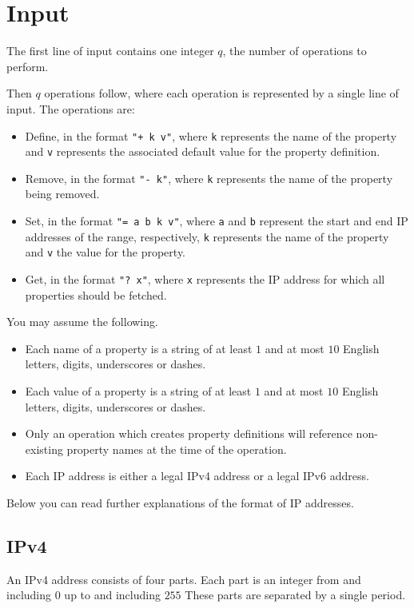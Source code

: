 \section*{Input}
The first line of input contains one integer $q$, the number of operations to perform.

Then $q$ operations follow, where each operation is represented by a single line of input.
The operations are:

\begin{itemize}
    \item Define, in the format \texttt{"+ k v"},
        where \texttt{k} represents the name of the property and \texttt{v} represents the associated default value for the property definition.
    \item Remove, in the format \texttt{"- k"}, where \texttt{k} represents the name of the property being removed.
    \item Set, in the format \texttt{"= a b k v"}, where \texttt{a} and \texttt{b} represent the start and end IP addresses of the range, respectively,
        \texttt{k} represents the name of the property and \texttt{v} the value for the property.
    \item Get, in the format \texttt{"? x"}, where \texttt{x} represents the IP address for which all properties should be fetched.
\end{itemize}

You may assume the following.
\begin{itemize}
    \item Each name of a property is a string of at least $1$ and at most $10$ English letters, digits, underscores or dashes.
    \item Each value of a property is a string of at least $1$ and at most $10$ English letters, digits, underscores or dashes.
    \item Only an operation which creates property definitions will reference non-existing property names at the time of the operation.
    \item Each IP address is either a legal IPv4 address or a legal IPv6 address.
\end{itemize}

Below you can read further explanations of the format of IP addresses.

\subsection*{IPv4}
An IPv4 address consists of four parts.
Each part is an integer from and including $0$ up to and including $255$
These parts are separated by a single period.

